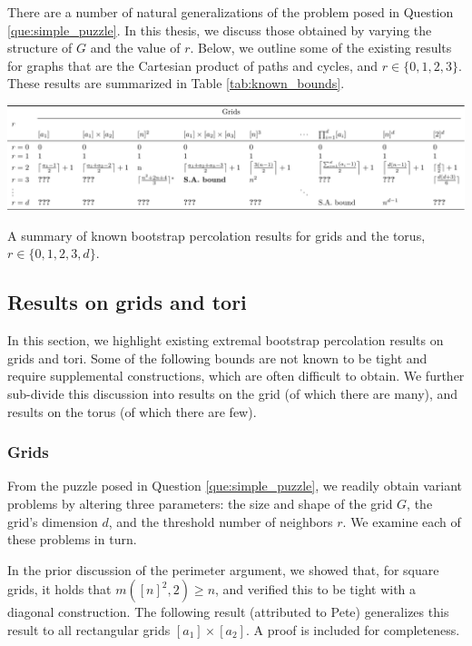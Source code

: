 There are a number of natural generalizations of the problem posed in Question \ref{que:simple_puzzle}. In this thesis, we discuss those obtained by varying the structure of $G$ and the value of $r$. Below, we outline some of the existing results for graphs that are the Cartesian product of paths and cycles, and $r \in \{0, 1, 2, 3\}$. These results are summarized in Table \ref{tab:known_bounds}.

\begin{table}[]
\centering
\includegraphics[width=\textwidth,origin=c]{tables/1/known_bounds.pdf}
\caption{A summary of known bootstrap percolation results for grids and the torus, $r \in \{0,1,2,3,d\}$.}
\label{tab:known_bounds}
\end{table} 

\subsection{Results on grids and tori}
\label{sec:result_summary}

In this section, we highlight existing extremal bootstrap percolation results on grids and tori. Some of the following bounds are not known to be tight and require supplemental constructions, which are often difficult to obtain. We further sub-divide this discussion into results on the grid (of which there are many), and results on the torus (of which there are few).

\subsubsection{Grids}

From the puzzle posed in Question \ref{que:simple_puzzle}, we readily obtain variant problems by altering three parameters: the size and shape of the grid $G$, the grid's dimension $d$, and the threshold number of neighbors $r$. We examine each of these problems in turn.

In the prior discussion of the perimeter argument, we showed that, for square grids, it holds that $m([n]^2, 2) \geq n$, and verified this to be tight with a diagonal construction. The following result (attributed to Pete) generalizes this result to all rectangular grids $[a_1] \times [a_2]$. A proof is included for completeness. 

